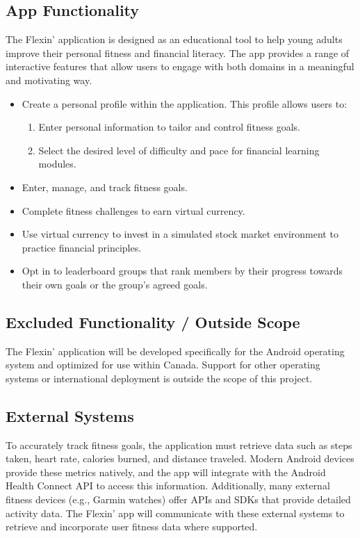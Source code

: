 \documentclass[12pt]{article}
\begin{document}
\subsection*{App Functionality}
The Flexin' application is designed as an educational tool to help young adults improve their personal fitness and financial literacy. The app provides a range of interactive features that allow users to engage with both domains in a meaningful and motivating way.
\begin{itemize}
    \item Create a personal profile within the application. This profile allows users to:
    \begin{enumerate}
        \item Enter personal information to tailor and control fitness goals.
        \item Select the desired level of difficulty and pace for financial learning modules.
    \end{enumerate}
    \item Enter, manage, and track fitness goals.
    \item Complete fitness challenges to earn virtual currency.
    \item Use virtual currency to invest in a simulated stock market environment to practice financial principles.
    \item Opt in to leaderboard groups that rank members by their progress towards their own goals or the group's agreed goals.
\end{itemize}
\subsection*{Excluded Functionality / Outside Scope}
The Flexin' application will be developed specifically for the Android operating system and optimized for use within Canada. Support for other operating systems or international deployment is outside the scope of this project.
\subsection*{External Systems}
To accurately track fitness goals, the application must retrieve data such as steps taken, heart rate, calories burned, and distance traveled. Modern Android devices provide these metrics natively, and the app will integrate with the Android Health Connect API to access this information.
Additionally, many external fitness devices (e.g., Garmin watches) offer APIs and SDKs that provide detailed activity data. The Flexin' app will communicate with these external systems to retrieve and incorporate user fitness data where supported.
\end{document}
